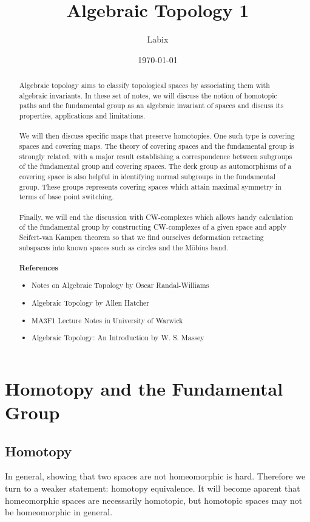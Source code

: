 \documentclass[a4paper]{article}
\title{Algebraic Topology 1}
\author{Labix}
\date{\today}
\begin{document}
\maketitle
\begin{abstract}
Algebraic topology aims to classify topological spaces by associating them with algebraic invariants. In these set of notes, we will discuss the notion of homotopic paths and the fundamental group as an algebraic invariant of spaces and discuss its properties, applications and limitations. \\~\\

We will then discuss specific maps that preserve homotopies. One such type is covering spaces and covering maps. The theory of covering spaces and the fundamental group is strongly related, with a major result establishing a correspondence between subgroups of the fundamental group and covering spaces. The deck group as automorphisms of a covering space is also helpful in identifying normal subgroups in the fundamental group. These groups represents covering spaces which attain maximal symmetry in terms of base point switching. \\~\\

Finally, we will end the discussion with CW-complexes which allows handy calculation of the fundamental group by constructing CW-complexes of a given space and apply Seifert-van Kampen theorem so that we find ourselves deformation retracting subspaces into known spaces such as circles and the Möbius band. \\~\\

\textbf{References}
\begin{itemize}
\item Notes on Algebraic Topology by Oscar Randal-Williams
\item Algebraic Topology by Allen Hatcher
\item MA3F1 Lecture Notes in University of Warwick
\item Algebraic Topology: An Introduction by W. S. Massey
\end{itemize}
\end{abstract}
\pagebreak
\tableofcontents
\pagebreak

\section{Homotopy and the Fundamental Group}
\subsection{Homotopy}
In general, showing that two spaces are not homeomorphic is hard. Therefore we turn to a weaker statement: homotopy equivalence. It will become aparent that homeomorphic spaces are necessarily homotopic, but homotopic spaces may not be homeomorphic in general. \\~\\
\end{document}
